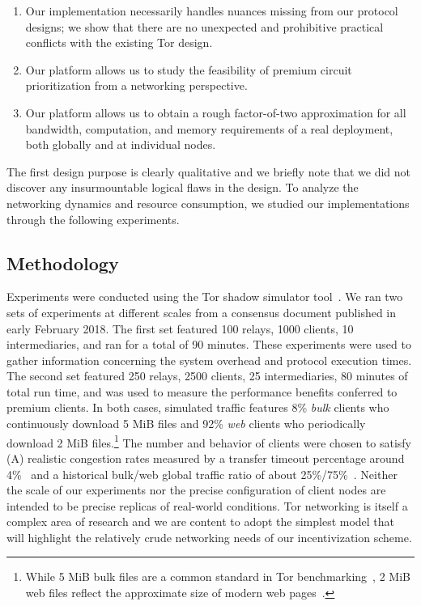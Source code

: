 \begin{enumerate}
\item Our implementation necessarily handles nuances missing from our protocol designs; we show that there are no unexpected and prohibitive practical conflicts with the existing Tor design.
\item Our platform allows us to study the feasibility of premium circuit prioritization from a networking perspective.
\item Our platform allows us to obtain a rough factor-of-two approximation for all bandwidth, computation, and memory requirements of a real deployment, both globally and at individual nodes.
\end{enumerate}

The first design purpose is clearly qualitative and we briefly note that we did not discover any insurmountable logical flaws in the design.
To analyze the networking dynamics and resource consumption, we studied our implementations through the following experiments.

\subsection{Methodology}
\label{subsec:methodology}

Experiments were conducted using the Tor shadow simulator tool~\cite{jansen2011shadow, tracey2018high}.
We ran two sets of experiments at different scales from a consensus document published in early February 2018.
The first set featured 100 relays, 1000 clients, 10 intermediaries, and ran for a total of 90 minutes.
These experiments were used to gather information concerning the system overhead and protocol execution times.
The second set featured 250 relays, 2500 clients, 25 intermediaries, 80 minutes of total run time, and was used to measure the performance benefits conferred to premium clients.
In both cases, simulated traffic features 8\% \emph{bulk} clients who continuously download 5 MiB files and 92\% \emph{web} clients who periodically download 2 MiB files.\footnote{While 5 MiB bulk files are a common standard in Tor benchmarking~\cite{portal2018tormetrics}, 2 MiB web files reflect the approximate size of modern web pages~\cite{team2018httparchive}.}
The number and behavior of clients were chosen to satisfy (A) realistic congestion rates measured by a transfer timeout percentage around 4\%~\cite{portal2018tormetrics} and a historical bulk/web global traffic ratio of about 25\%/75\%~\cite{privcount-ccs2016, learning-ccs2018}.
Neither the scale of our experiments nor the precise configuration of client nodes are intended to be precise replicas of real-world conditions.
Tor networking is itself a complex area of research and we are content to adopt the simplest model that will highlight the relatively crude networking needs of our incentivization scheme.

